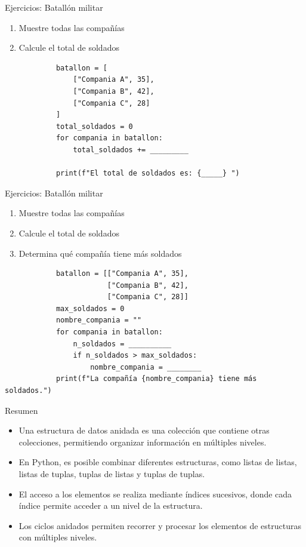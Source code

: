 \documentclass{beamer}
\begin{document}
    \begin{frame}[fragile, t]{Ejercicios: Batallón militar}
        \begin{enumerate}
            \item Muestre todas las compañías
            \item Calcule el total de soldados
        \end{enumerate}
        \begin{verbatim}
            batallon = [
                ["Compania A", 35],
                ["Compania B", 42],
                ["Compania C", 28]
            ]
            total_soldados = 0
            for compania in batallon:
                total_soldados += _________
                
            print(f"El total de soldados es: {_____} ")
        \end{verbatim}
    \end{frame}

    \begin{frame}[fragile, t]{Ejercicios: Batallón militar}
        \begin{enumerate}
            \item Muestre todas las compañías
            \item Calcule el total de soldados
            \item Determina qué compañía tiene más soldados
        \end{enumerate}
        \begin{verbatim}
            batallon = [["Compania A", 35],
                        ["Compania B", 42],
                        ["Compania C", 28]]
            max_soldados = 0
            nombre_compania = ""
            for compania in batallon:
                n_soldados = __________
                if n_soldados > max_soldados:
                    nombre_compania = ________
            print(f"La compañía {nombre_compania} tiene más soldados.")
        \end{verbatim}
    \end{frame}

    \begin{frame}[fragile, t]{Resumen}
        \begin{itemize}
            \item Una estructura de datos anidada es una colección que contiene otras colecciones, 
            permitiendo organizar información en múltiples niveles.
            \item En Python, es posible combinar diferentes estructuras, como listas de listas, listas de tuplas, 
            tuplas de listas y tuplas de tuplas.
            \item El acceso a los elementos se realiza mediante índices sucesivos, donde cada índice permite acceder 
            a un nivel de la estructura.
            \item Los ciclos anidados permiten recorrer y procesar los elementos de estructuras con múltiples niveles.
        \end{itemize}
    \end{frame}
\end{document}
